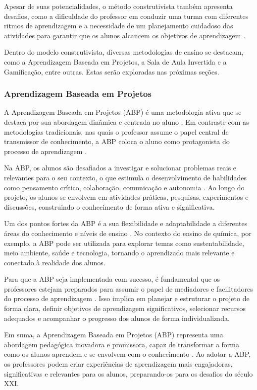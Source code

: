 Apesar de suas potencialidades, o método construtivista também apresenta desafios, como a dificuldade do professor em conduzir uma turma com diferentes ritmos de aprendizagem e a necessidade de um planejamento cuidadoso das atividades para garantir que os alunos alcancem os objetivos de aprendizagem \cite{haddadetal1993,pinho2010}.

Dentro do modelo construtivista, diversas metodologias de ensino se destacam, como a Aprendizagem Baseada em Projetos, a Sala de Aula Invertida e a Gamificação, entre outras. Estas serão exploradas nas próximas seções.

\subsubsection{Aprendizagem Baseada em Projetos}

A Aprendizagem Baseada em Projetos (ABP) é uma metodologia ativa que se destaca por sua abordagem dinâmica e centrada no aluno \cite{alecia2022}. Em contraste com as metodologias tradicionais, nas quais o professor assume o papel central de transmissor de conhecimento, a ABP coloca o aluno como protagonista do processo de aprendizagem \cite{fartura2007}.

Na ABP, os alunos são desafiados a investigar e solucionar problemas reais e relevantes para o seu contexto, o que estimula o desenvolvimento de habilidades como pensamento crítico, colaboração, comunicação e autonomia \cite{moran2014}. Ao longo do projeto, os alunos se envolvem em atividades práticas, pesquisas, experimentos e discussões, construindo o conhecimento de forma ativa e significativa.

Um dos pontos fortes da ABP é a sua flexibilidade e adaptabilidade a diferentes áreas do conhecimento e níveis de ensino \cite{bacich2018}. No contexto do ensino de química, por exemplo, a ABP pode ser utilizada para explorar temas como sustentabilidade, meio ambiente, saúde e tecnologia, tornando o aprendizado mais relevante e conectado à realidade dos alunos.

Para que a ABP seja implementada com sucesso, é fundamental que os professores estejam preparados para assumir o papel de mediadores e facilitadores do processo de aprendizagem \cite{diesel2017}. Isso implica em planejar e estruturar o projeto de forma clara, definir objetivos de aprendizagem significativos, selecionar recursos adequados e acompanhar o progresso dos alunos de forma individualizada.

Em suma, a Aprendizagem Baseada em Projetos (ABP) representa uma abordagem pedagógica inovadora e promissora, capaz de transformar a forma como os alunos aprendem e se envolvem com o conhecimento \cite{arthur2020}. Ao adotar a ABP, os professores podem criar experiências de aprendizagem mais engajadoras, significativas e relevantes para os alunos, preparando-os para os desafios do século XXI.

